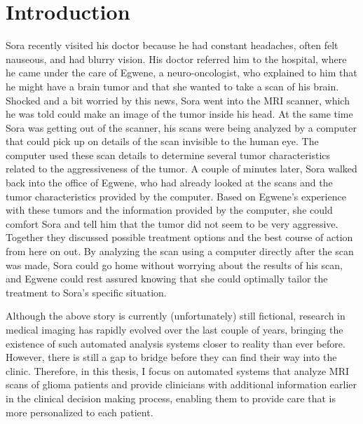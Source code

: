 
\chapter{Introduction}\label{chap:introduction}

\begin{ChapterAbstractNoTitle}
Sora recently visited his doctor because he had constant headaches, often felt nauseous, and had blurry vision.
His doctor referred him to the hospital, where he came under the care of Egwene, a neuro-oncologist, who explained to him that he might have a brain \gls{tumor} and that she wanted to take a scan of his brain.
Shocked and a bit worried by this news, Sora went into the MRI scanner, which he was told could make an image of the \gls{tumor} inside his head.
At the same time Sora was getting out of the scanner, his scans were being analyzed by a computer that could pick up on details of the scan invisible to the human eye.
The computer used these scan details to determine several \gls{tumor} characteristics related to the aggressiveness of the \gls{tumor}.
A couple of minutes later, Sora walked back into the office of Egwene, who had already looked at the scans and the \gls{tumor} characteristics provided by the computer.
Based on Egwene's experience with these \glspl{tumor} and the information provided by the computer, she could comfort Sora and tell him that the \gls{tumor} did not seem to be very aggressive.
Together they discussed possible treatment options and the best course of action from here on out.
By analyzing the scan using a computer directly after the scan was made, Sora could go home without worrying about the results of his scan, and Egwene could rest assured knowing that she could optimally tailor the treatment to Sora's specific situation.
\end{ChapterAbstractNoTitle}

Although the above story is currently (unfortunately) still fictional, research in medical imaging has rapidly evolved over the last couple of years, bringing the existence of such automated analysis systems closer to reality than ever before.
However, there is still a gap to bridge before they can find their way into the clinic.
Therefore, in this thesis, I focus on automated systems that analyze \acrshort{MRI} scans of glioma patients and provide clinicians with additional information earlier in the clinical decision making process, enabling them to provide care that is more personalized to each patient.


